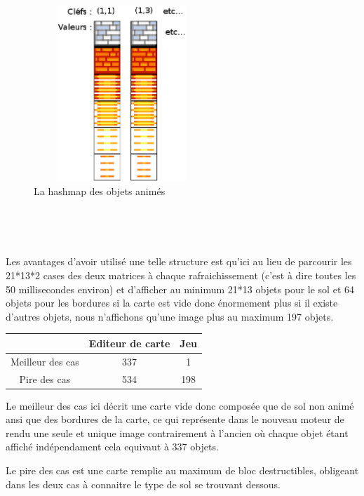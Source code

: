 			\begin{figure}[h]			
				\begin{center}						
					\includegraphics[width=250px, height=250px]{Developpement/Img/hashmap.eps}
					\caption{La hashmap des objets animés}
				\end{center}
			\end{figure}

			$\,$
			
			$\,$

			Les avantages d'avoir utilisé une telle structure est qu'ici au lieu de
			parcourir les 21*13*2 cases des deux matrices à chaque rafraichissement
			(c'est à dire toutes les 50 millisecondes environ) et d'afficher au minimum
			21*13 objets pour le sol et 64 objets pour les bordures si la carte est vide
			donc énormement plus si il existe d'autres objets, nous n'affichons qu'une
			image plus au maximum 197 objets.
			
			\begin{center}
				\begin{tabular}{|c|c|c|} \hline
				  & Editeur de carte & Jeu    \\\hline 
				Meilleur des cas & 337 & 1    \\\hline
				Pire des cas     & 534 & 198  \\\hline		
				\end{tabular}
			\end{center}
			
			Le meilleur des cas ici décrit une carte vide donc composée que de sol non
			animé ansi que des bordures de la carte, ce qui représente dans le nouveau
			moteur de rendu une seule et unique image contrairement à l'ancien où chaque
			objet étant affiché indépendament cela equivaut à 337 objets.
			
			Le pire des cas est une carte remplie au maximum de bloc destructibles,
			obligeant dans les deux cas à connaitre le type de sol se trouvant dessous.
			
